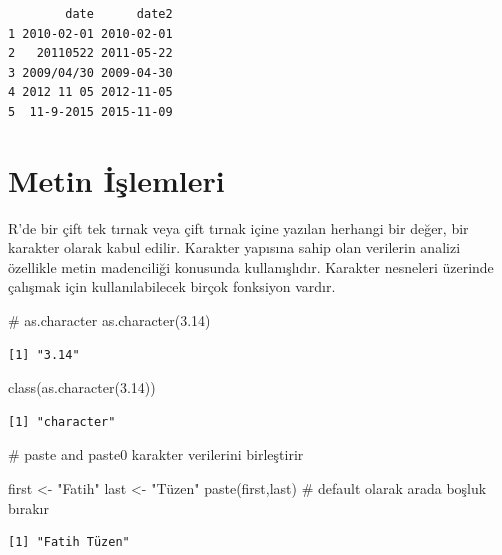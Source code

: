 \documentclass[
  letterpaper,
  DIV=11,
  numbers=noendperiod]{scrreprt}
\newenvironment{Shaded}{\begin{snugshade}}{\end{snugshade}}
\newcommand{\CommentTok}[1]{\textcolor[rgb]{0.37,0.37,0.37}{#1}}
\newcommand{\FloatTok}[1]{\textcolor[rgb]{0.68,0.00,0.00}{#1}}
\newcommand{\FunctionTok}[1]{\textcolor[rgb]{0.28,0.35,0.67}{#1}}
\newcommand{\NormalTok}[1]{\textcolor[rgb]{0.00,0.23,0.31}{#1}}
\newcommand{\OtherTok}[1]{\textcolor[rgb]{0.00,0.23,0.31}{#1}}
\newcommand{\StringTok}[1]{\textcolor[rgb]{0.13,0.47,0.30}{#1}}
\begin{document}
\begin{verbatim}
        date      date2
1 2010-02-01 2010-02-01
2   20110522 2011-05-22
3 2009/04/30 2009-04-30
4 2012 11 05 2012-11-05
5  11-9-2015 2015-11-09
\end{verbatim}

\chapter{Metin İşlemleri}\label{metin-iux15flemleri}

R'de bir çift tek tırnak veya çift tırnak içine yazılan herhangi bir
değer, bir karakter olarak kabul edilir. Karakter yapısına sahip olan
verilerin analizi özellikle metin madenciliği konusunda kullanışlıdır.
Karakter nesneleri üzerinde çalışmak için kullanılabilecek birçok
fonksiyon vardır.

\begin{Shaded}
\begin{Highlighting}[]
\CommentTok{\# as.character}
\FunctionTok{as.character}\NormalTok{(}\FloatTok{3.14}\NormalTok{)}
\end{Highlighting}
\end{Shaded}

\begin{verbatim}
[1] "3.14"
\end{verbatim}

\begin{Shaded}
\begin{Highlighting}[]
\FunctionTok{class}\NormalTok{(}\FunctionTok{as.character}\NormalTok{(}\FloatTok{3.14}\NormalTok{))}
\end{Highlighting}
\end{Shaded}

\begin{verbatim}
[1] "character"
\end{verbatim}

\begin{Shaded}
\begin{Highlighting}[]
\CommentTok{\# paste and paste0 karakter verilerini birleştirir}

\NormalTok{first }\OtherTok{\textless{}{-}} \StringTok{"Fatih"}
\NormalTok{last }\OtherTok{\textless{}{-}} \StringTok{"Tüzen"}
\FunctionTok{paste}\NormalTok{(first,last) }\CommentTok{\# default olarak arada boşluk bırakır}
\end{Highlighting}
\end{Shaded}

\begin{verbatim}
[1] "Fatih Tüzen"
\end{verbatim}
\end{document}
